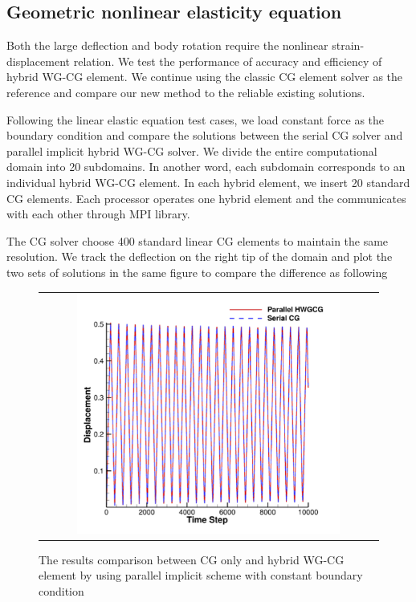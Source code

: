  \subsection{Geometric nonlinear elasticity equation}
 
 Both the large deflection and body rotation require the nonlinear strain-displacement relation. We test the performance of accuracy and efficiency of hybrid WG-CG element. We continue using the classic CG element solver as the reference and compare our new method to the reliable existing solutions.
 
 Following the linear elastic equation test cases, we load constant force as the boundary condition and compare the solutions between the serial CG solver and parallel implicit hybrid WG-CG solver. We divide the entire computational domain into 20 subdomains. In another word, each subdomain corresponds to an individual hybrid WG-CG element. In each hybrid element, we insert 20 standard CG elements. Each processor operates one hybrid element and the communicates with each other through MPI library. 
 
 The CG solver choose 400 standard linear CG elements to maintain the same resolution. We track the deflection on the right tip of the domain and plot the two sets of solutions in the same figure to compare the difference as following
 
  \begin{figure}[H]
  	\centering
  	\begin{tabular}{c}
  		\includegraphics[width=0.8\textwidth]{./pics/result1d4.png}
  	\end{tabular}
  	\caption{\footnotesize The results comparison between CG only and hybrid WG-CG element by using parallel implicit scheme with constant boundary condition}
  \end{figure}
  
